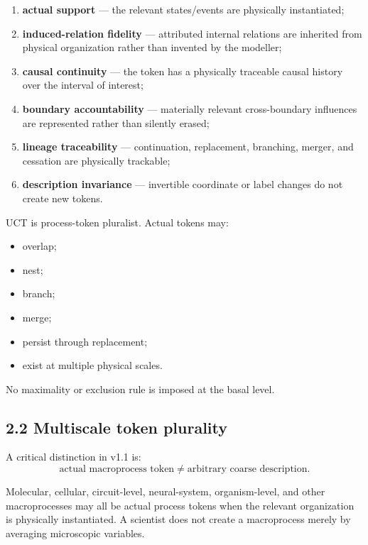 \documentclass[
  11pt,
  a4paper,
]{article}
\providecommand{\tightlist}{%
  \setlength{\itemsep}{0pt}\setlength{\parskip}{0pt}}
\begin{document}
\begin{enumerate}
\def\labelenumi{\arabic{enumi}.}
\tightlist
\item
  \textbf{actual support} --- the relevant states/events are physically
  instantiated;
\item
  \textbf{induced-relation fidelity} --- attributed internal relations
  are inherited from physical organization rather than invented by the
  modeller;
\item
  \textbf{causal continuity} --- the token has a physically traceable
  causal history over the interval of interest;
\item
  \textbf{boundary accountability} --- materially relevant
  cross-boundary influences are represented rather than silently erased;
\item
  \textbf{lineage traceability} --- continuation, replacement,
  branching, merger, and cessation are physically trackable;
\item
  \textbf{description invariance} --- invertible coordinate or label
  changes do not create new tokens.
\end{enumerate}

UCT is process-token pluralist. Actual tokens may:

\begin{itemize}
\tightlist
\item
  overlap;
\item
  nest;
\item
  branch;
\item
  merge;
\item
  persist through replacement;
\item
  exist at multiple physical scales.
\end{itemize}

No maximality or exclusion rule is imposed at the basal level.

\hypertarget{multiscale-token-plurality}{%
\subsection{2.2 Multiscale token
plurality}\label{multiscale-token-plurality}}

A critical distinction in v1.1 is:
\nopagebreak[4]
\[
\boxed{
\text{actual macroprocess token}
\neq
\text{arbitrary coarse description}.
}
\]

Molecular, cellular, circuit-level, neural-system, organism-level, and
other macroprocesses may all be actual process tokens when the relevant
organization is physically instantiated. A scientist does not create a
macroprocess merely by averaging microscopic variables.
\end{document}
